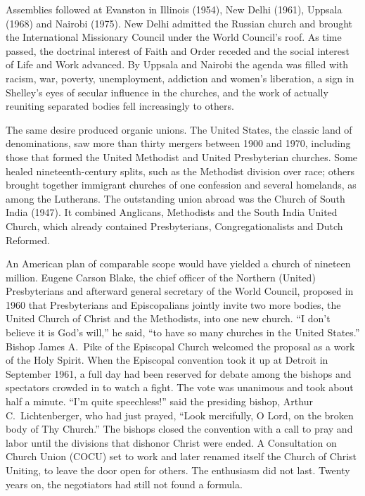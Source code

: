 Assemblies followed at Evanston in Illinois (1954), New Delhi (1961), Uppsala (1968) and Nairobi
(1975). New Delhi admitted the Russian church and brought the International Missionary Council under
the World Council's roof. As time passed, the doctrinal interest of Faith and Order receded and the
social interest of Life and Work advanced. By Uppsala and Nairobi the agenda was filled with racism,
war, poverty, unemployment, addiction and women's liberation, a sign in Shelley's eyes of secular
influence in the churches, and the work of actually reuniting separated bodies fell increasingly to
others.

The same desire produced organic unions. The United States, the classic land of denominations, saw
more than thirty mergers between 1900 and 1970, including those that formed the United Methodist and
United Presbyterian churches. Some healed nineteenth-century splits, such as the Methodist division
over race; others brought together immigrant churches of one confession and several homelands, as
among the Lutherans. The outstanding union abroad was the Church of South India (1947). It combined
Anglicans, Methodists and the South India United Church, which already contained Presbyterians,
Congregationalists and Dutch Reformed.

An American plan of comparable scope would have yielded a church of nineteen million. Eugene Carson
Blake, the chief officer of the Northern (United) Presbyterians and afterward general secretary of
the World Council, proposed in 1960 that Presbyterians and Episcopalians jointly invite two more bodies, the United Church of Christ and the Methodists, into one new church. ``I don't believe it is God's will,'' he said,
``to have so many churches in the United States.'' Bishop James A.~Pike of the Episcopal Church
welcomed the proposal as a work of the Holy Spirit. When the Episcopal convention took it up at
Detroit in September 1961, a full day had been reserved for debate among the bishops and spectators
crowded in to watch a fight. The vote was unanimous and took about half a minute. ``I'm quite
speechless!'' said the presiding bishop, Arthur C.~Lichtenberger, who had just prayed, ``Look
mercifully, O Lord, on the broken body of Thy Church.'' The bishops closed the convention with a call
to pray and labor until the divisions that dishonor Christ were ended. A Consultation on Church Union
(COCU) set to work and later renamed itself the Church of Christ Uniting, to leave the door open for
others. The enthusiasm did not last. Twenty years on, the negotiators had still not found a formula.

